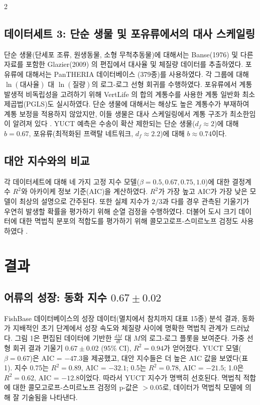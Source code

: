 \documentclass[11pt,a4paper]{article}
\newcommand{\df}{d_f}
\begin{document}
\begin{multicols}{2}
		\subsection{데이터세트 3: 단순 생물 및 포유류에서의 대사 스케일링}
		
		단순 생물(단세포 조류, 원생동물, 소형 무척추동물)에 대해서는 Banse(1976) \cite{Banse1976} 및 다른 자료를 포함한 Glazier(2009) \cite{Glazier2009}의 편집에서 대사율 및 체질량 데이터를 추출하였다. 포유류에 대해서는 PanTHERIA 데이터베이스 \cite{PanTHERIA}(379종)를 사용하였다. 각 그룹에 대해 \(\ln(\text{대사율})\) 대 \(\ln(\text{질량})\)의 로그-로그 선형 회귀를 수행하였다. 포유류에서 계통발생적 비독립성을 고려하기 위해 VertLife \cite{VertLife}의 합의 계통수를 사용한 계통 일반화 최소제곱법(PGLS)도 실시하였다. 단순 생물에 대해서는 해상도 높은 계통수가 부재하여 계통 보정을 적용하지 않았지만, 이들 생물은 대사 스케일링에서 계통 구조가 최소한임이 알려져 있다 \cite{Glazier2005}. YUCT 예측은 수송이 확산 제한되는 단순 생물(\(\df \approx 2\))에 대해 \(b = 0.67\), 포유류(최적화된 프랙탈 네트워크, \(\df \approx 2.2\))에 대해 \(b \approx 0.74\)이다.
		
		\subsection{대안 지수와의 비교}
		
		각 데이터세트에 대해 네 가지 고정 지수 모델(\(\beta = 0.5, 0.67, 0.75, 1.0\))에 대한 결정계수 \(R^2\)와 아카이케 정보 기준(AIC)을 계산하였다. \(R^2\)가 가장 높고 AIC가 가장 낮은 모델이 최상의 설명으로 간주된다. 또한 실제 지수가 \(2/3\)과 다를 경우 관측된 기울기가 우연히 발생할 확률을 평가하기 위해 순열 검정을 수행하였다. 더불어 도시 크기 데이터에 대한 멱법칙 분포의 적합도를 평가하기 위해 콜모고로프-스미르노프 검정도 사용하였다 \cite{Clauset2009}.
		
		\section{결과}
		
		\subsection{어류의 성장: 동화 지수 \(0.67 \pm 0.02\)}
		
		FishBase 데이터베이스의 성장 데이터(멸치에서 참치까지 대표 15종) 분석 결과, 동화가 지배적인 초기 단계에서 성장 속도와 체질량 사이에 명확한 멱법칙 관계가 드러났다. 그림 1은 편집된 데이터에 기반한 \(\frac{dM}{dt}\) 대 \(M\)의 로그-로그 플롯을 보여준다. 가중 선형 회귀 결과 기울기 \(0.67 \pm 0.02\) (95\% CI), \(R^2 = 0.94\)가 얻어졌다. YUCT 모델(\(\beta = 0.67\))은 AIC = \(-47.3\)을 제공했고, 대안 지수들은 더 높은 AIC 값을 보였다(표 1). 지수 0.75는 \(R^2 = 0.89\), AIC = \(-32.1\); 0.5는 \(R^2 = 0.78\), AIC = \(-21.5\); 1.0은 \(R^2 = 0.62\), AIC = \(-12.8\)이었다. 따라서 YUCT 지수가 명백히 선호된다. 멱법칙 적합에 대한 콜모고로프-스미르노프 검정의 p-값은 \(>0.05\)로, 데이터가 멱법칙 모델에 의해 잘 기술됨을 나타낸다.
		

\end{multicols}
\end{document}

